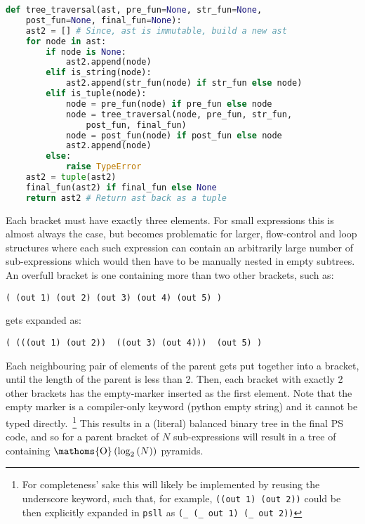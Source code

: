\documentclass[aip,jcp,reprint,footinbib]{revtex4-1}
\makeatletter
\DeclareMathOperator{\bigO}{\ensuremath{\mathoms{O}}}
\let\tt\texttt
\newcommand\psll{\texttt{psll}\xspace}
\renewcommand\paragraph{\@startsection{paragraph}{4}{\parindent}{\parskip}{-1em}{\normalfont \normalsize \bfseries}}
\makeatother
\begin{document}
\begin{lstlisting}[language=python,
    label={lst:tree_traversal},caption={
    Core \psll function performing a depth-first walk through the abstract syntax tree and application of appropriate functions.
}]
def tree_traversal(ast, pre_fun=None, str_fun=None,
    post_fun=None, final_fun=None):
    ast2 = [] # Since, ast is immutable, build a new ast
    for node in ast:
        if node is None:
            ast2.append(node)
        elif is_string(node):
            ast2.append(str_fun(node) if str_fun else node)
        elif is_tuple(node):
            node = pre_fun(node) if pre_fun else node
            node = tree_traversal(node, pre_fun, str_fun, 
                post_fun, final_fun)
            node = post_fun(node) if post_fun else node
            ast2.append(node)
        else:
            raise TypeError
    ast2 = tuple(ast2)
    final_fun(ast2) if final_fun else None
    return ast2 # Return ast back as a tuple
\end{lstlisting}

\paragraph{Implicit bracket expansion} Each bracket must have exactly three elements. For small expressions this is almost always the case, but becomes problematic for larger, flow-control and loop structures where each such expression can contain an arbitrarily large number of sub-expressions which would then have to be manually nested in empty subtrees. An overfull bracket is one containing more than two other brackets, such as:
\begin{lstlisting}[language=psll,aboveskip=3pt,belowskip=-2pt,frame=none,numbers=none]
  ( (out 1) (out 2) (out 3) (out 4) (out 5) )
\end{lstlisting}
gets expanded as:
\begin{lstlisting}[language=psll,aboveskip=3pt,belowskip=-2pt,frame=none,numbers=none]
  ( (((out 1) (out 2))  ((out 3) (out 4)))  (out 5) )
\end{lstlisting}
Each neighbouring pair of elements of the parent gets put together into a bracket, until the length of the parent is less than 2. Then, each bracket with exactly 2 other brackets has the empty-marker inserted as the first element. Note that the empty marker is a compiler-only keyword (python empty string) and it cannot be typed directly.~\footnote{For completeness' sake this will likely be implemented by reusing the underscore keyword, such that, for example, \tt{((out 1) (out 2))} could be then explicitly expanded in \psll as \tt{(\_ (\_ out 1) (\_ out 2))}} This results in a (literal) balanced binary tree in the final PS code, and so for a parent bracket of $N$ sub-expressions will result in a tree of containing $\bigO\left(\log_2\left(N\right)\right)$ pyramids.
\end{document}
